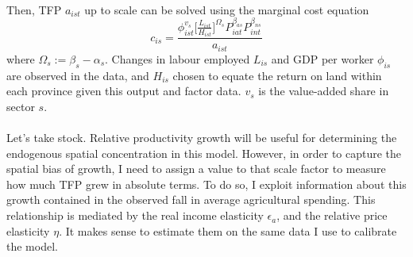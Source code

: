 \documentclass[]{article}
\theoremstyle{plain}
\begin{document}
\paragraph*{}
 Then, TFP $a_{ist}$ up to scale can be solved using the marginal cost equation
\begin{equation}\label{marginalcosts}
c_{is} = \frac{\phi_{ist}^{v_{s}}\bigg[\frac{L_{ist}}{H_{ist}}\bigg]^{\Omega_{s}}P_{iat}^{\beta_{as}}P_{int}^{\beta_{ns}}}{a_{ist}}		
\end{equation}
where $\Omega_{s} := \beta_{s} - \alpha_{s}$. Changes in labour employed $L_{is}$ and GDP per worker  $\phi_{is}$ are observed in the data, and  $H_{is}$ chosen to equate the return on land within each province given this output and factor data. $v_{s}$ is the value-added share in sector $s$. 
\paragraph*{}  
Let's take stock. Relative productivity growth will be useful for determining the endogenous spatial concentration in this model. However, in order to capture the spatial bias of growth, I need to assign a value to that scale factor to measure how much TFP grew in absolute terms. To do so, I exploit information about this growth contained in the observed fall in average agricultural spending. This relationship is mediated by the real income elasticity $\epsilon_{a}$, and the relative price elasticity $\eta$. It makes sense to estimate them on the same data I use to calibrate the model.  
\end{document}
